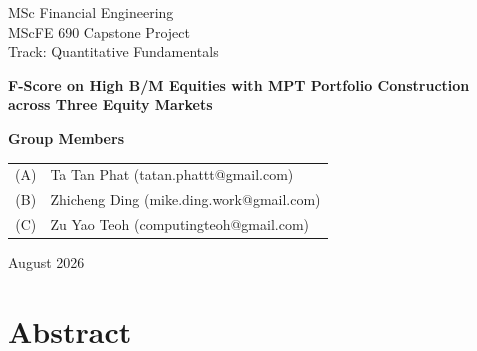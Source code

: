 \documentclass[11pt,a4paper]{report}
\numberwithin{figure}{chapter}
\numberwithin{table}{chapter}
\numberwithin{equation}{chapter}
\begin{document}
\pagestyle{fancy}
\fancyhf{}
\fancyfoot[C]{\thepage}
\renewcommand{\headrulewidth}{0.4pt}

\begin{titlepage}
\thispagestyle{empty}

\begin{center}



\vspace{0.6cm}

MSc Financial Engineering\\
MScFE 690 Capstone Project\\
Track: Quantitative Fundamentals

\vspace{1.6cm}

\Large
\textbf{F-Score on High B/M Equities with MPT Portfolio Construction across Three Equity Markets}

\vspace{1.5cm}

\normalsize
\textbf{Group Members}

\vspace{0.3cm}

\begin{tabular}{@{}c l@{}}
(A) & Ta Tan Phat (tatan.phattt@gmail.com) \\
(B) & Zhicheng Ding (mike.ding.work@gmail.com) \\
(C) & Zu Yao Teoh (computingteoh@gmail.com) \\
\end{tabular}

\vfill

August 2026

\end{center}

\end{titlepage}


\chapter*{Abstract}
\end{document}
